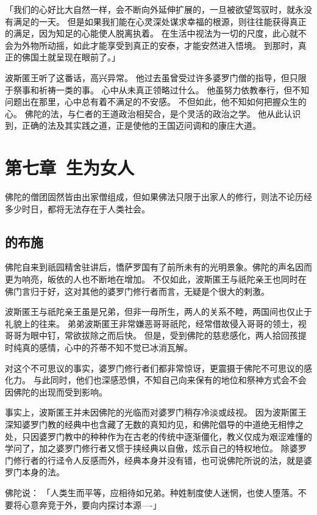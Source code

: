 \documentclass[twoside,openany]{book}
\begin{document}
「我们的心好比大自然一样，会不断向外延伸扩展的，一旦被欲望驾驭时，就永没有满足的一天。
但是如果我扪能在心灵深处谋求幸福的根源，则往往能获得真正的满足，因为知足的心能使人脱离执着。
在生活中视法为一切的尺度，此心就不会为外物所动摇，如此才能享受到真正的安泰，才能安然进入悟境。
到那时，真正的佛国土就呈现在眼前了。」

波斯匿王听了这番话，高兴异常。
他过去虽曾受过许多婆罗门僧的指导，但只限于祭事和祈祷一类的事。
心中从未真正领略过什么。
他虽努力依教奉行，但不知问题出在那里，心中总有着不满足的不安感。
不但如此，他不知如何把握众生的心。
佛陀的法，与仁者的王道政治相契合，是个灵活的政治之学。
他从此认识到，正确的法及其实践之道，正是使他的王国迈问调和的康庄大道。

\chapter{第七章\ 生为女人}\label{ch7}
佛陀的僧团固然皆由出家僧组成，但如果佛法只限于出家人的修行，则法不论历经多少时日，都将无法存在于人类社会。

\section{的布施}\label{sec7.1}

佛陀自来到祇园精舍驻讲后，憍萨罗国有了前所未有的光明景象。佛陀的声名因而更为响亮，皈依的人也不断地在增加。
不仅如此，波斯匿王与祇陀亲王也同时在佛门言归于好，这对其他的婆罗门修行者而言，无疑是个很大的剌激。

波斯匿王与祇陀亲王虽是兄弟，但非一母所生，两人的关系不睦，两国间也仅止于礼貌上的往来。
弟弟波斯匿王非常嫌恶哥哥祇陀，经常借故侵入哥哥的领土，视哥哥为眼中钉，常欲拔除之而后快。
但是，受到佛陀的慈悲感化，两人拾回孩提时纯真的感情，心中的芥蒂不知不觉已冰消瓦解。

对这个不可思议的事实，婆罗门修行者们都非常惊讶，更震摄于佛陀不可思议的感化力。
与此同时，他们也深感恐惧，不知自己向来保有的地位和祭神方式会不会因佛陀的出现而受到影响。

事实上，波斯匿王并未因佛陀的光临而对婆罗门稍存冷淡或歧视。
因为波斯匿王深知婆罗门教的经典中也含藏了无数的真知灼见，和佛陀倡导的中道绝无相悖之处，只因婆罗门教中的种种作为在古老的传统中逐渐僵化，教义仅成为艰涩难懂的学问了，加之婆罗门修行者又惯于挟经典以自傲，炫示自己的特权地位。
除婆罗门修行者的行迳令人反感而外，经典本身并没有错，也可说佛陀所说的法，就是婆罗门本身的法。

佛陀说：
「人类生而平等，应相待如兄弟。种姓制度使人迷惘，也使人堕落。不要将心意奔竞于外，要向内探讨本源----」
\end{document}
